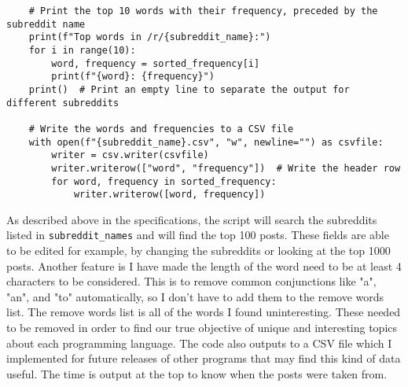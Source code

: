 \documentclass{article}
\theoremstyle{theorem}
\theoremstyle{definition}
\theoremstyle{remark}
\begin{document}
\begin{lstlisting}
    # Print the top 10 words with their frequency, preceded by the subreddit name
    print(f"Top words in /r/{subreddit_name}:")
    for i in range(10):
        word, frequency = sorted_frequency[i]
        print(f"{word}: {frequency}")
    print()  # Print an empty line to separate the output for different subreddits

    # Write the words and frequencies to a CSV file
    with open(f"{subreddit_name}.csv", "w", newline="") as csvfile:
        writer = csv.writer(csvfile)
        writer.writerow(["word", "frequency"])  # Write the header row
        for word, frequency in sorted_frequency:
            writer.writerow([word, frequency])
\end{lstlisting}

\medskip
As described above in the specifications, the script will search the subreddits listed in \verb |subreddit_names| and will find the top 100 posts. These fields are able to be edited for example, by changing the subreddits or looking at the top 1000 posts. Another feature is I have made the length of the word need to be at least 4 characters to be considered. This is to remove common conjunctions like "a", "an", and "to" automatically, so I don't have to add them to the remove words list. The remove words list is all of the words I found uninteresting. These needed to be removed in order to find our true objective of unique and interesting topics about each programming language. The code also outputs to a CSV file which I implemented for future releases of other programs that may find this kind of data useful. The time is output at the top to know when the posts were taken from.
\end{document}
